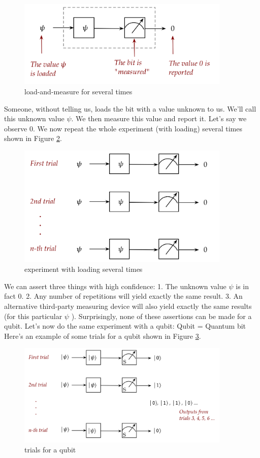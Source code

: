 \documentclass[main.tex]{subfiles}
\begin{document}
    \begin{figure}
        \centering
        \includegraphics[width=4in]{notes/figs/n05/03bit3.png}
        \caption{load-and-measure for several times}
        \label{fig:03bit3}
    \end{figure}
    
    Someone, without telling us, loads the bit with a value unknown to us. We'll call this unknown value $\psi$. We then measure this value and report it. Let's say we observe 0. We now repeat the whole experiment (with loading) several times shown in Figure \ref{fig:04bit4}.
    
    \begin{figure}
        \centering
        \includegraphics[width=4in]{notes/figs/n05/04bit4.png}
        \caption{experiment with loading several times}
        \label{fig:04bit4}
    \end{figure}
    
    We can assert three things with high confidence: 1. The unknown value $\psi$ is in fact 0. 2. Any number of repetitions will yield exactly the same result. 3. An alternative third-party measuring device will also yield exactly the same results (for this particular $\psi$ ). Surprisingly, none of these assertions can be made for a qubit. Let's now do the same experiment with a qubit: Qubit = Quantum bit Here's an example of some trials for a qubit shown in Figure \ref{fig:05qubit1}.
    
    \begin{figure}
        \centering
        \includegraphics[width=4in]{notes/figs/n05/05qubit1.png}
        \caption{trials for a qubit}
        \label{fig:05qubit1}
    \end{figure}
    
\end{document}
